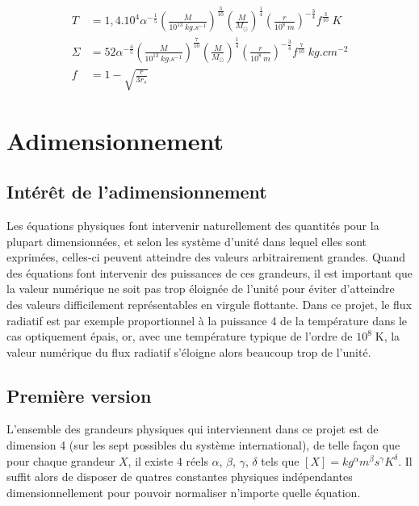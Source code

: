 \documentclass[a4paper,12pt]{article}
\begin{document}
\begin{align}
T &= 1,4.10^4 \alpha^{-\frac{1}{5}} \left(\frac{\dot{M}}{10^{13}\ kg.s^{-1}} \right)^{\frac{3}{10}} \left(\frac{M}{M_{\odot}} \right)^{\frac{1}{4}} \left(\frac{r}{10^8\ m} \right)^{-\frac{3}{4}} f^{\frac{3}{10}}\ K \label{eq:stationnaire}\\
\Sigma &= 52 \alpha^{-\frac{4}{5}} \left(\frac{\dot{M}}{10^{13}\ kg.s^{-1}} \right)^{\frac{7}{10}} \left(\frac{M}{M_{\odot}} \right)^{\frac{1}{4}} \left(\frac{r}{10^8\ m} \right)^{-\frac{3}{4}} f^{\frac{7}{10}}\ kg.cm^{-2}\\
f &= 1-\sqrt{\frac{r}{3r_s}}
\end{align}



\section{Adimensionnement}
    \subsection{Intérêt de l'adimensionnement}
    
        Les équations physiques font intervenir naturellement des quantités pour la plupart dimensionnées, et selon les système d'unité dans lequel elles sont exprimées, celles-ci peuvent atteindre des valeurs arbitrairement grandes. Quand des équations font intervenir des puissances de ces grandeurs, il est important que la valeur numérique ne soit pas trop éloignée de l'unité pour éviter d'atteindre des valeurs difficilement représentables en virgule flottante. Dans ce projet, le flux radiatif est par exemple proportionnel à la puissance 4 de la température dans le cas optiquement épais, or, avec une température typique de l'ordre de $ 10^8\;$K, la valeur numérique du flux radiatif s'éloigne alors beaucoup trop de l'unité.

	\subsection{Première version}
		L'ensemble des grandeurs physiques qui interviennent dans ce projet est de dimension 4 (sur les sept possibles du système international), de telle façon que pour chaque grandeur $X$, il existe 4 réels $\alpha$, $\beta$, $\gamma$, $\delta$ tels que $[X]=kg^{\alpha}m^{\beta}s^{\gamma}K^{\delta}$. Il suffit alors de disposer de quatres constantes physiques indépendantes dimensionnellement pour pouvoir normaliser n'importe quelle équation.
\end{document}
